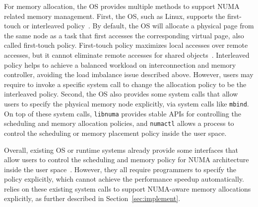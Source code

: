 For memory allocation, the OS provides multiple methods to support NUMA related memory management. First, the OS, such as Linux, supports the first-touch or interleaved policy~\cite{lameter2013numa, diener2015locality}. By default, the OS will allocate a physical page from the same node as a task that first accesses the corresponding virtual page, also called  first-touch policy. First-touch policy maximizes local accesses over remote accesses, but it cannot eliminate remote accesses for shared objects~\cite{yang2019jarena}. Interleaved policy helps to achieve a balanced workload  on interconnection and memory controller, avoiding the load imbalance issue described above. However, users may require to invoke a specific system call to change the allocation policy to be the interleaved policy. Second, the OS also provides some system calls that allow users to specify the physical memory node explicitly, via system calls like \texttt{mbind}. On top of these system calls, \texttt{libnuma} provides stable APIs for controlling the scheduling and memory allocation policies, and \texttt{numactl} allows a process to control the scheduling or memory placement policy inside the user space. 

Overall, existing OS or runtime systems already provide some interfaces that allow users to control the scheduling and memory policy for NUMA architecture inside the user space~\cite{yang2019jarena}. However, they all require programmers to specify the policy explicitly, which cannot achieve the performance speedup automatically. \NM{} relies on these existing system calls to support NUMA-aware memory allocations explicitly, as further described in Section~\ref{sec:implement}. 







 